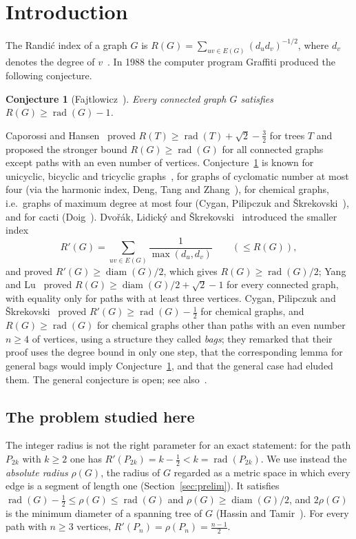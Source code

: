 \documentclass[11pt]{amsart}
\newtheorem{conjecture}[theorem]{Conjecture}
\theoremstyle{definition}
\newcommand{\rad}{\operatorname{rad}}
\newcommand{\diam}{\operatorname{diam}}
\newcommand{\Rp}{R'}
\begin{document}
\tableofcontents

\section{Introduction}\label{sec:intro}

The Randi\'c index of a graph $G$ is $R(G)=\sum_{uv\in E(G)}(d_ud_v)^{-1/2}$, where $d_v$ denotes the degree of
$v$~\cite{Randic}. In 1988 the computer program Graffiti produced the following conjecture.

\begin{conjecture}[Fajtlowicz~\cite{Fajtlowicz}]\label{conj:F}
Every connected graph $G$ satisfies $R(G)\ge\rad(G)-1$.
\end{conjecture}

Caporossi and Hansen~\cite{CaporossiHansen} proved $R(T)\ge\rad(T)+\sqrt2-\frac32$ for trees $T$ and proposed the
stronger bound $R(G)\ge\rad(G)$ for all connected graphs except paths with an even number of vertices.
Conjecture~\ref{conj:F} is known for unicyclic, bicyclic and tricyclic graphs~\cite{LiuGutman,YouLiu}, for graphs of
cyclomatic number at most four (via the harmonic index, Deng, Tang and Zhang~\cite{DTZ}), for chemical graphs, i.e.\
graphs of maximum degree at most four (Cygan, Pilipczuk and \v{S}krekovski~\cite{CPS}), and for cacti
(Doig~\cite{Doig1}). Dvo\v{r}\'ak, Lidick\'y and \v{S}krekovski~\cite{DLS} introduced the smaller index
\[
\Rp(G)=\sum_{uv\in E(G)}\frac1{\max(d_u,d_v)}\qquad(\le R(G)),
\]
and proved $\Rp(G)\ge\diam(G)/2$, which gives $R(G)\ge\rad(G)/2$; Yang and Lu~\cite{YangLu} proved
$R(G)\ge\diam(G)/2+\sqrt2-1$ for every connected graph, with equality only for paths with at least three vertices. Cygan, Pilipczuk and \v{S}krekovski~\cite{CPS}
proved $\Rp(G)\ge\rad(G)-\frac12$ for chemical graphs, and $R(G)\ge\rad(G)$ for chemical graphs other than paths
with an even number $n\ge4$ of vertices, using a structure they called \emph{bags}; they remarked that their proof uses
the degree bound in only one step, that the corresponding lemma for general bags would imply
Conjecture~\ref{conj:F}, and that the general case had eluded them.
The general conjecture is open; see also~\cite{Doig2}.

\subsection{The problem studied here}
The integer radius is not the right parameter for an exact statement: for the path $P_{2k}$ with $k\ge2$ one has
$\Rp(P_{2k})=k-\frac12<k=\rad(P_{2k})$. We use instead the \emph{absolute radius} $\rho(G)$, the radius of $G$ regarded
as a metric space in which every edge is a segment of length one (Section~\ref{sec:prelim}). It satisfies
$\rad(G)-\frac12\le\rho(G)\le\rad(G)$ and $\rho(G)\ge\diam(G)/2$, and $2\rho(G)$ is the minimum diameter of a spanning
tree of $G$ (Hassin and Tamir~\cite{HassinTamir}). For every path with $n\ge3$ vertices, $\Rp(P_n)=\rho(P_n)=\frac{n-1}2$.
\end{document}
